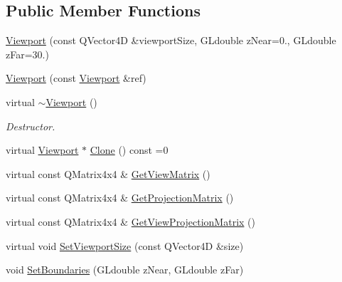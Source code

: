 \subsection*{Public Member Functions}
\begin{DoxyCompactItemize}
\item 
\mbox{\hyperlink{class_geometry_engine_1_1_geometry_item_utils_1_1_viewport_a7533300b9cc61738b14fc0d6c67593ce}{Viewport}} (const Q\+Vector4D \&viewport\+Size, G\+Ldouble z\+Near=0., G\+Ldouble z\+Far=30.)
\item 
\mbox{\hyperlink{class_geometry_engine_1_1_geometry_item_utils_1_1_viewport_a77455d64d5b6fec118f95438aff987c2}{Viewport}} (const \mbox{\hyperlink{class_geometry_engine_1_1_geometry_item_utils_1_1_viewport}{Viewport}} \&ref)
\item 
\mbox{\label{class_geometry_engine_1_1_geometry_item_utils_1_1_viewport_a4f99bc87e9c31f3b0a5a6c66c8391178}} 
virtual \mbox{\hyperlink{class_geometry_engine_1_1_geometry_item_utils_1_1_viewport_a4f99bc87e9c31f3b0a5a6c66c8391178}{$\sim$\+Viewport}} ()
\begin{DoxyCompactList}\small\item\em Destructor. \end{DoxyCompactList}\item 
virtual \mbox{\hyperlink{class_geometry_engine_1_1_geometry_item_utils_1_1_viewport}{Viewport}} $\ast$ \mbox{\hyperlink{class_geometry_engine_1_1_geometry_item_utils_1_1_viewport_a8bd47866a001eae03f88df67fd699904}{Clone}} () const =0
\item 
virtual const Q\+Matrix4x4 \& \mbox{\hyperlink{class_geometry_engine_1_1_geometry_item_utils_1_1_viewport_ac3c9ce922326ed25d5ffa8d3c7ffc0ca}{Get\+View\+Matrix}} ()
\item 
virtual const Q\+Matrix4x4 \& \mbox{\hyperlink{class_geometry_engine_1_1_geometry_item_utils_1_1_viewport_a65f5f4ab19355462cb52127e7c1eb73d}{Get\+Projection\+Matrix}} ()
\item 
virtual const Q\+Matrix4x4 \& \mbox{\hyperlink{class_geometry_engine_1_1_geometry_item_utils_1_1_viewport_a026573276a6c7523adf0a2024597da46}{Get\+View\+Projection\+Matrix}} ()
\item 
virtual void \mbox{\hyperlink{class_geometry_engine_1_1_geometry_item_utils_1_1_viewport_aee56ad377f9615e64c33bdef3d05c94f}{Set\+Viewport\+Size}} (const Q\+Vector4D \&size)
\item 
void \mbox{\hyperlink{class_geometry_engine_1_1_geometry_item_utils_1_1_viewport_a9500d8b22395ee3f94611881ea89b0aa}{Set\+Boundaries}} (G\+Ldouble z\+Near, G\+Ldouble z\+Far)

\end{DoxyCompactItemize}
